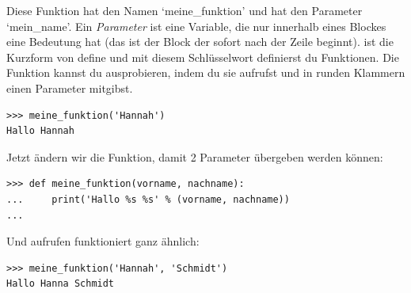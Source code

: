 Diese Funktion hat den Namen `meine\_funktion' und hat den Parameter `mein\_name'. Ein \emph{Parameter} ist eine Variable, die nur innerhalb eines Blockes eine Bedeutung hat (das ist der Block der sofort nach der  Zeile beginnt).  ist die Kurzform von define und mit diesem Schlüsselwort definierst du Funktionen. Die Funktion kannst du ausprobieren, indem du sie aufrufst und in runden Klammern einen Parameter mitgibst.

\begin{Verbatim}[frame=single]
>>> meine_funktion('Hannah')
Hallo Hannah
\end{Verbatim}


\noindent
Jetzt ändern wir die Funktion, damit 2 Parameter übergeben werden können:

\begin{Verbatim}[frame=single]
>>> def meine_funktion(vorname, nachname):
...     print('Hallo %s %s' % (vorname, nachname))
...
\end{Verbatim}

\noindent
Und aufrufen funktioniert ganz ähnlich:

\begin{Verbatim}[frame=single]
>>> meine_funktion('Hannah', 'Schmidt')
Hallo Hanna Schmidt
\end{Verbatim}

